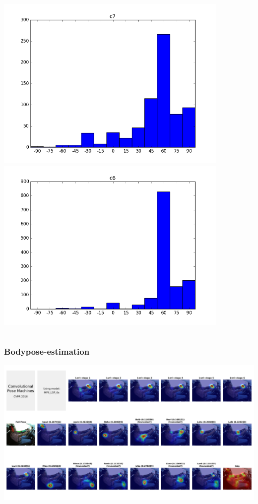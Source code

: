 \documentclass{beamer}
\begin{document}
\begin{frame}
\begin{columns}
\begin{column}{0.5\textwidth}
\begin{center}
		 			\includegraphics[width=0.85\textwidth]{headpose_evaluation_c7}\\
		 			\includegraphics[width=0.85\textwidth]{headpose_evaluation_c6}
		 		\end{center}
		 	\end{column}
		 \end{columns}
	\end{frame}

	\begin{frame}
		\frametitle{Bodypose-estimation}
		\includegraphics[width=1\textwidth]{bodypose_example_cpu}\\
	\end{frame}	
\end{document}
